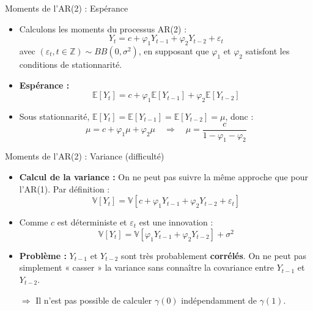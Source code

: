 \documentclass[11pt,aspectratio=169]{beamer}
\newcommand{\E}{\mathbb{E}}
\newcommand{\Var}{\mathbb{V}}
\newcommand{\Z}{\mathbb{Z}}
\begin{document}
\begin{frame}{Moments de l'AR(2) : Espérance}

\begin{itemize}

\item Calculons les moments du processus AR(2) :
\[
Y_t = c + \varphi_1 Y_{t-1} + \varphi_2 Y_{t-2} + \varepsilon_t
\]
avec $(\varepsilon_t, t \in \Z) \sim BB(0, \sigma^2)$, en supposant que $\varphi_1$ et $\varphi_2$ satisfont les conditions de stationnarité.\newline

\item \textbf{Espérance :}
\[
\E[Y_t] = c + \varphi_1 \E[Y_{t-1}] + \varphi_2 \E[Y_{t-2}]
\]

\item Sous stationnarité, $\E[Y_t] = \E[Y_{t-1}] = \E[Y_{t-2}] = \mu$, donc :
\[
\mu = c + \varphi_1 \mu + \varphi_2 \mu \quad \Rightarrow \quad \boxed{\mu = \frac{c}{1 - \varphi_1 - \varphi_2}}
\]

\end{itemize}
\end{frame}

\begin{frame}{Moments de l'AR(2) : Variance (difficulté)}

\begin{itemize}

\item \textbf{Calcul de la variance :} On ne peut pas suivre la même approche que pour l'AR(1).
Par définition :
\[
\Var[Y_t] = \Var[c + \varphi_1 Y_{t-1} + \varphi_2 Y_{t-2} + \varepsilon_t]
\]

\item Comme $c$ est déterministe et $\varepsilon_t$ est une innovation :
\[
\Var[Y_t] = \Var[\varphi_1 Y_{t-1} + \varphi_2 Y_{t-2}] + \sigma^2
\]

\item \textbf{Problème :} $Y_{t-1}$ et $Y_{t-2}$ sont très probablement \textbf{corrélés}. On ne peut pas simplement « casser » la variance sans connaître la covariance entre $Y_{t-1}$ et $Y_{t-2}$.

$\Rightarrow$ Il n'est pas possible de calculer $\gamma(0)$ indépendamment de $\gamma(1)$.

\end{itemize}
\end{frame}
\end{document}
